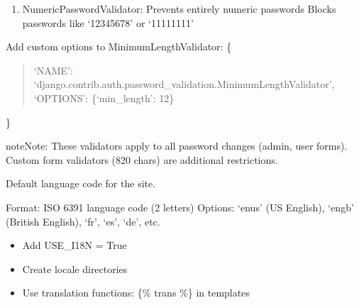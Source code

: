 \documentclass[letterpaper,10pt,english]{sphinxmanual}
\begin{document}
\begin{fulllineitems}
\begin{enumerate}
\item {} 
\sphinxAtStartPar
NumericPasswordValidator:
\sphinxhyphen{} Prevents entirely numeric passwords
\sphinxhyphen{} Blocks passwords like ‘12345678’ or ‘11111111’

\end{enumerate}
\begin{description}
\sphinxAtStartPar
Add custom options to MinimumLengthValidator:
\{
\begin{quote}

\sphinxAtStartPar
‘NAME’: ‘django.contrib.auth.password\_validation.MinimumLengthValidator’,
‘OPTIONS’: \{‘min\_length’: 12\}
\end{quote}

\sphinxAtStartPar
\}

\end{description}

\begin{sphinxadmonition}{note}{Note:}
\sphinxAtStartPar
These validators apply to all password changes (admin, user forms).
Custom form validators (8\sphinxhyphen{}20 chars) are additional restrictions.
\end{sphinxadmonition}

\end{fulllineitems}


\begin{fulllineitems}
\label{\detokenize{softwareProject:softwareProject.settings.LANGUAGE_CODE}}
\pysigstartsignatures
\pysigline
{}
\pysigstopsignatures
\sphinxAtStartPar
Default language code for the site.

\sphinxAtStartPar
Format: ISO 639\sphinxhyphen{}1 language code (2 letters)
Options: ‘en\sphinxhyphen{}us’ (US English), ‘en\sphinxhyphen{}gb’ (British English), ‘fr’, ‘es’, ‘de’, etc.
\begin{description}
\begin{itemize}
\item {} 
\sphinxAtStartPar
Add USE\_I18N = True

\item {} 
\sphinxAtStartPar
Create locale directories

\item {} 
\sphinxAtStartPar
Use translation functions: \{\% trans \%\} in templates

\end{itemize}

\end{description}

\end{fulllineitems}
\end{document}
